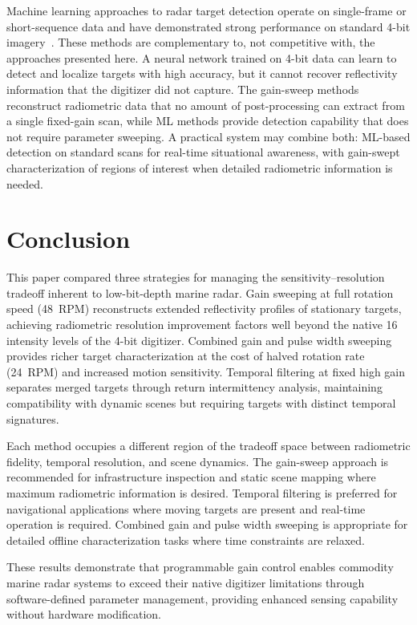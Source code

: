 \documentclass[twocolumn, 10pt]{article}
\begin{document}
Machine learning approaches to radar target detection operate on single-frame or short-sequence data and have demonstrated strong performance on standard 4-bit imagery~\cite{Baird2020CNNLSTM, Wang2023SALALSTM, Chen2021PPInet}. These methods are complementary to, not competitive with, the approaches presented here. A neural network trained on 4-bit data can learn to detect and localize targets with high accuracy, but it cannot recover reflectivity information that the digitizer did not capture. The gain-sweep methods reconstruct radiometric data that no amount of post-processing can extract from a single fixed-gain scan, while ML methods provide detection capability that does not require parameter sweeping. A practical system may combine both: ML-based detection on standard scans for real-time situational awareness, with gain-swept characterization of regions of interest when detailed radiometric information is needed.


\section{Conclusion}

This paper compared three strategies for managing the sensitivity--resolution tradeoff inherent to low-bit-depth marine radar. Gain sweeping at full rotation speed (48~RPM) reconstructs extended reflectivity profiles of stationary targets, achieving radiometric resolution improvement factors well beyond the native 16 intensity levels of the 4-bit digitizer. Combined gain and pulse width sweeping provides richer target characterization at the cost of halved rotation rate (24~RPM) and increased motion sensitivity. Temporal filtering at fixed high gain separates merged targets through return intermittency analysis, maintaining compatibility with dynamic scenes but requiring targets with distinct temporal signatures.

Each method occupies a different region of the tradeoff space between radiometric fidelity, temporal resolution, and scene dynamics. The gain-sweep approach is recommended for infrastructure inspection and static scene mapping where maximum radiometric information is desired. Temporal filtering is preferred for navigational applications where moving targets are present and real-time operation is required. Combined gain and pulse width sweeping is appropriate for detailed offline characterization tasks where time constraints are relaxed.

These results demonstrate that programmable gain control enables commodity marine radar systems to exceed their native digitizer limitations through software-defined parameter management, providing enhanced sensing capability without hardware modification.




\nocite{*}
\end{document}
